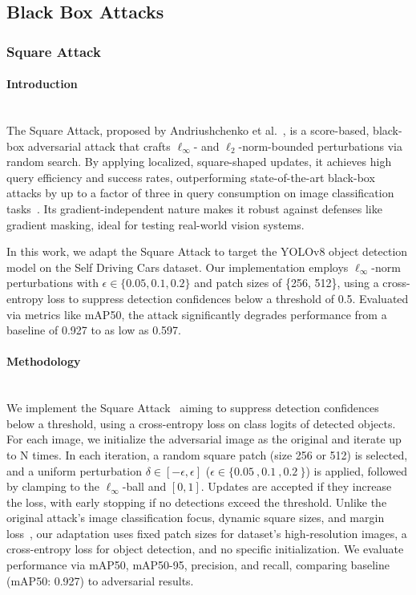 \documentclass[../main.tex]{subfiles}
\begin{document}
\subsection{Black Box Attacks}
\subsubsection{Square Attack}
\paragraph{Introduction}\leavevmode\\
The Square Attack, proposed by Andriushchenko et al.~\cite{andriushchenko2020square}, is a score-based, black-box adversarial attack that crafts $\ell_\infty$- and $\ell_2$-norm-bounded perturbations via random search. By applying localized, square-shaped updates, it achieves high query efficiency and success rates, outperforming state-of-the-art black-box attacks by up to a factor of three in query consumption on image classification tasks~\cite{andriushchenko2020square}. Its gradient-independent nature makes it robust against defenses like gradient masking, ideal for testing real-world vision systems.

In this work, we adapt the Square Attack to target the YOLOv8 object detection model on the Self Driving Cars dataset. Our implementation employs $\ell_\infty$-norm perturbations with $\epsilon \in \{0.05, 0.1, 0.2\}$ and patch sizes of \{256, 512\}, using a cross-entropy loss to suppress detection confidences below a threshold of \SI{0.5}{}. Evaluated via metrics like mAP50, the attack significantly degrades performance from a baseline of \SI{0.927}{} to as low as \SI{0.597}{}.


\paragraph{Methodology}\leavevmode\\
We implement the Square Attack~\cite{andriushchenko2020square} aiming to suppress detection confidences below a threshold, using a cross-entropy loss on class logits of detected objects. For each image, we initialize the adversarial image as the original and iterate up to N times. In each iteration, a random square patch (size 256 or 512) is selected, and a uniform perturbation $\delta \in [-\epsilon, \epsilon]$ ($\epsilon \in \{\SI{0.05}{},\SI{0.1}{}, \SI{0.2}{}\}$) is applied, followed by clamping to the $\ell_\infty$-ball and $[0,1]$. Updates are accepted if they increase the loss, with early stopping if no detections exceed the threshold. Unlike the original attack’s image classification focus, dynamic square sizes, and margin loss~\cite{andriushchenko2020square}, our adaptation uses fixed patch sizes for dataset’s high-resolution images, a cross-entropy loss for object detection, and no specific initialization. We evaluate performance via mAP50, mAP50-95, precision, and recall, comparing baseline (mAP50: \SI{0.927}{}) to adversarial results.
\end{document}
